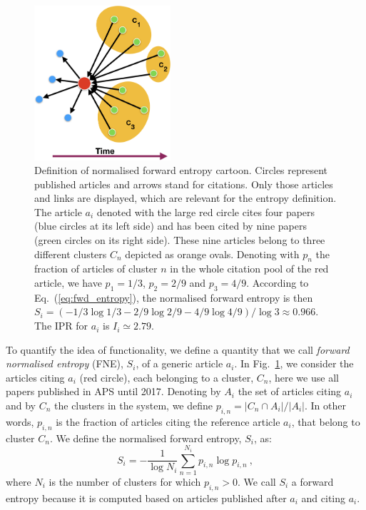 \documentclass[draft,final]{vutinfth} %
\begin{document}
\begin{figure}[t]
  \centering
  \includegraphics[width=0.45\textwidth]{figures_exaptation/fwd-entropy.png}
  \caption{Definition of normalised forward entropy cartoon.
    Circles represent published articles and arrows stand for citations. 
    Only those articles and links are displayed, which are relevant for the entropy definition. The article $a_i$ denoted with the large red circle cites four papers (blue circles at its left side) and has been cited by nine papers (green circles on its right side). These nine articles belong to three different clusters $C_n$ depicted as orange ovals. Denoting with $p_n$ the fraction of articles of cluster $n$ in the whole citation pool of the red article, we have $p_1=1/3$, $p_2=2/9$ and $p_3=4/9$. According to Eq.~(\ref{eq:fwd_entropy}), the normalised forward entropy is then $S_i=(-1/3 \log 1/3 - 2/9 \log 2/9 - 4/9 \log 4/9)/\log 3 \approx 0.966$. The IPR for $a_i$ is $I_i \simeq 2.79$.}
  \label{fig:fwd_entropy}
\end{figure}
%
To quantify the idea of functionality, we define a quantity that we call {\em forward normalised entropy} (FNE), $S_i$, of a generic article  $a_i$. In Fig.~\ref{fig:fwd_entropy}, we consider the articles citing  $a_i$ (red circle), each belonging to a cluster, $C_n$, here we use all papers published in APS until 2017. Denoting by $A_i$ the set of articles citing $a_i$ and by $C_n$ the clusters in the system, we define $p_{i,n} = |C_n\cap A_i| / |A_i|$. In other words, $p_{i,n}$ is the fraction of articles citing the reference article $a_i$, that belong to cluster $C_n$. We define the normalised forward entropy, $S_i$,  as:
%
\begin{equation}
  S_i = -\frac{1}{\log N_i}\sum_{n=1}^{N_i} p_{i,n} \log p_{i,n}\ ,
  \label{eq:fwd_entropy}
\end{equation}
%
\noindent where $N_i$ is the number of clusters for which $p_{i,n}>0$.
We call $S_i$ a forward entropy because it is computed based on articles published after $a_i$ and citing $a_i$.
\end{document}

